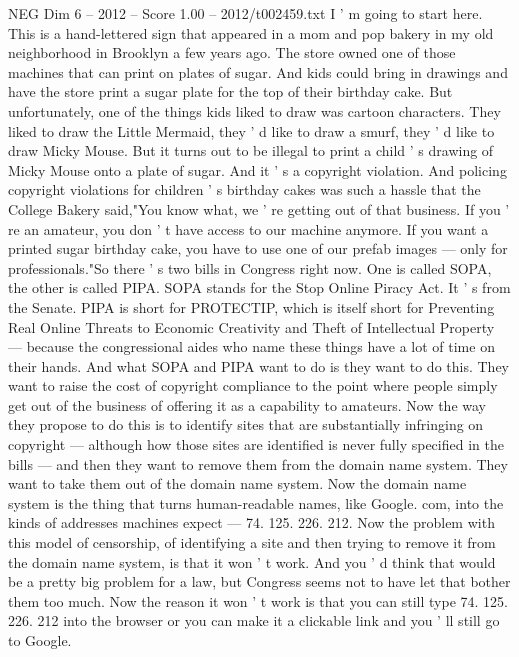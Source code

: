 \begin{textsample}{NEG Dim 6 – 2012 – Score 1.00 – 2012/t002459.txt}  \label{ex:f6_neg_036}
I ' m going to start here.
This is a hand-lettered sign that appeared in a mom and pop bakery in my old neighborhood in Brooklyn a few years ago.
The store owned one of those machines that can print on plates of sugar.
And kids could bring in drawings and have the store print a sugar plate for the top of their birthday cake.
But unfortunately, one of the things kids liked to draw was cartoon characters.
They liked to draw the Little Mermaid, they ' d like to draw a smurf, they ' d like to draw Micky Mouse.
But it turns out to be illegal to print a child ' s drawing of Micky Mouse onto a plate of sugar.
And it ' s a copyright violation.
And policing copyright violations for children ' s birthday cakes was such a hassle that the College Bakery said,"You know what, we ' re getting out of that business.
If you ' re an amateur, you don ' t have access to our machine anymore.
If you want a printed sugar birthday cake, you have to use one of our prefab images — only for professionals."So there ' s two bills in Congress right now.
One is called SOPA, the other is called PIPA.
SOPA stands for the Stop Online Piracy Act.
It ' s from the Senate.
PIPA is short for PROTECTIP, which is itself short for Preventing Real Online Threats to Economic Creativity and Theft of Intellectual Property — because the congressional aides who name these things have a lot of time on their hands.
And what SOPA and PIPA want to do is they want to do this.
They want to raise the cost of copyright compliance to the point where people simply get out of the business of offering it as a capability to amateurs.
Now the way they propose to do this is to identify sites that are substantially infringing on copyright — although how those sites are identified is never fully specified in the bills — and then they want to remove them from the domain name system.
They want to take them out of the domain name system.
Now the domain name system is the thing that turns human-readable names, like Google. com, into the kinds of addresses machines expect — 74. 125. 226. 212.
Now the problem with this model of censorship, of identifying a site and then trying to remove it from the domain name system, is that it won ' t work.
And you ' d think that would be a pretty big problem for a law, but Congress seems not to have let that bother them too much.
Now the reason it won ' t work is that you can still type 74. 125. 226. 212 into the browser or you can make it a clickable link and you ' ll still go to Google.

\end{textsample}
